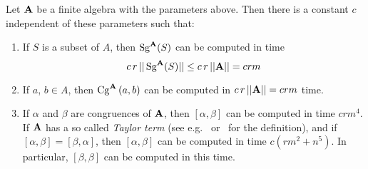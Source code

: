 \documentclass{ws-ijac}
\begin{document}
\begin{proposition}\label{speedprop}
Let $\alg A$ be a finite algebra with the parameters above. Then
there is a constant $c$ independent of these parameters
such that:
\begin{enumerate}
\item \label{speed1} If $S$ is a subset of $A$,
then $\Sg^{\alg A}(S)$ can be computed
in time
\[
c\, r\,||\Sg^{\alg A}(S)|| \le c\, r\,||\alg A|| = crm
\]
\item \label{speed2} If $a$, $b \in A$, then $\Cga a b A$ can be
computed in
$c\, r\, ||\alg A|| = crm$ time.
\item \label{speed3}
If $\alpha$ and $\beta$ are congruences of $\alg A$,
then $[\alpha,\beta]$ can be computed in time $crm^4$.
If $\alg A$ has a so called \emph{Taylor term}
(see e.g.~\cite{MR3076179} or~\cite{HM:1988} for the definition),
and if $[\alpha,\beta] = [\beta,\alpha]$,
then $[\alpha,\beta]$ can be computed in time $c(rm^2 + n^5)$.
In particular, $[\beta,\beta]$ can be computed in this time.
\end{enumerate}
\end{proposition}
\end{document}
